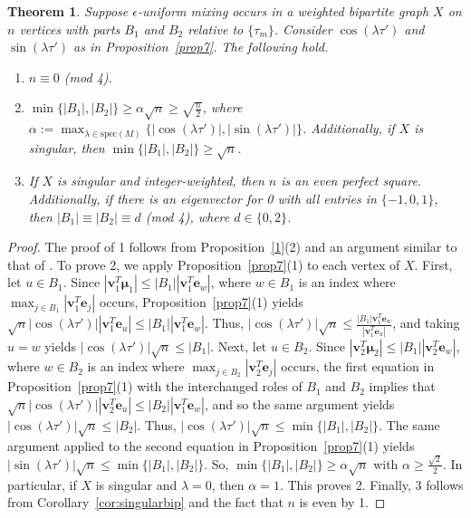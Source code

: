 \documentclass[11pt]{article}
\newtheorem{theorem}{Theorem}
\newcommand{\be}{\mathbf e}
\newcommand{\bv}{\mathbf v}
\newcommand{\bmu}{{\boldsymbol{\mu}}}
\newcommand\spec{{\mathrm{spec}}}
\begin{document}
\begin{theorem}
\label{thm:eumbip}
Suppose $\epsilon$-uniform mixing occurs in a weighted bipartite graph $X$ on $n$ vertices with parts $B_1$ and $B_2$ relative to $\{\tau_m\}$. Consider $\cos(\lambda\tau')$ and $\sin(\lambda\tau')$ as in Proposition~\ref{prop7}. The following hold.
\begin{enumerate}
\item $n\equiv 0$ (mod 4).
\item 
$\min\{|B_1|,|B_2|\}\geq\alpha\sqrt{n}\geq\sqrt{\frac{n}{2}}$, where $\alpha:=\displaystyle\max_{\lambda\in\spec(M)}\{|\cos(\lambda\tau')|,|\sin(\lambda\tau')|\}$. Additionally, if $X$ is singular, then $\min\{|B_1|,|B_2|\}\geq \sqrt{n}$.
\item If $X$ is singular and integer-weighted, then $n$ is an even perfect square. Additionally, if there is an eigenvector for 0 with all entries in $\{-1,0,1\}$, then $|B_1|\equiv |B_2|\equiv d$ (mod 4), where $d\in\{0,2\}$.
\end{enumerate}
\end{theorem}

\begin{proof}
The proof of 1 follows from Proposition~\ref{1}(2) and an argument similar to that of \cite{Godsil2013}. To prove 2, we apply Proposition~\ref{prop7}(1) to each vertex of $X$. First, let $u\in B_1$. Since $|\bv_1^T\bmu_1|\leq |B_1||\bv_1^T\be_w|$, where $w\in B_1$ is an index where $\max_{j\in B_1}|\bv_1^T\be_j|$ occurs, Proposition~\ref{prop7}(1) yields $\sqrt{n}|\cos(\lambda\tau')||\bv_1^T\be_u|\leq |B_1||\bv_1^T\be_w|$. Thus, $|\cos(\lambda\tau')|\sqrt{n}\leq \frac{|B_1|\bv_1^T\be_w}{|\bv_1^T\be_u|}$, and taking $u=w$ yields $|\cos(\lambda\tau')|\sqrt{n}\leq |B_1|$. Next, let $u\in B_2$. Since $|\bv_2^T\bmu_2|\leq |B_1||\bv_2^T\be_w|$, where $w\in B_2$ is an index where $\max_{j\in B_2}|\bv_2^T\be_j|$ occurs, the first equation in Proposition~\ref{prop7}(1) with the interchanged roles of $B_1$ and $B_2$ implies that $\sqrt{n}|\cos(\lambda\tau')||\bv_2^T\be_u|\leq |B_2||\bv_1^T\be_w|$, and so the same argument yields $|\cos(\lambda\tau')|\sqrt{n}\leq |B_2|$. Thus, $|\cos(\lambda\tau')|\sqrt{n}\leq\min\{|B_1|, |B_2|\}$. The same argument applied to the second equation in Proposition~\ref{prop7}(1) yields $|\sin(\lambda\tau')|\sqrt{n}\leq\min\{|B_1|, |B_2|\}$. So, $\min\{|B_1|,|B_2|\}\geq\alpha\sqrt{n}$ with $\alpha\geq\frac{\sqrt{2}}{2}$. In particular, if $X$ is singular and $\lambda=0$, then $\alpha=1$. This proves 2. Finally, 3 follows from Corollary~\ref{cor:singularbip} and the fact that $n$ is even by 1.
\end{proof}
\end{document}
